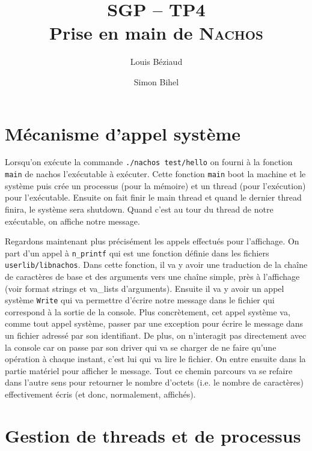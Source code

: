 \documentclass[a4paper,11pt,french]{article}
\title{SGP -- TP4\\Prise en main de \textsc{Nachos}}
\author{Louis Béziaud \and Simon Bihel}
\begin{document}
\maketitle

\section{Mécanisme d'appel système}
Lorsqu'on exécute la commande \texttt{./nachos test/hello} on fourni à la fonction \texttt{main} de nachos l'exécutable à exécuter. Cette fonction \texttt{main} boot la machine et le système puis crée un processus (pour la mémoire) et un thread (pour l'exécution) pour l'exécutable. Ensuite on fait finir le main thread et quand le dernier thread finira, le système sera shutdown. Quand c'est au tour du thread de notre exécutable, on affiche notre message.


Regardons maintenant plus précisément les appels effectués pour l'affichage. On part d'un appel à \texttt{n\_printf} qui est une fonction définie dans les fichiers \texttt{userlib/libnachos}. Dans cette fonction, il va y avoir une traduction de la chaîne de caractères de base et des arguments vers une chaîne simple, près à l'affichage (voir format strings et va\_lists d'arguments). Ensuite il va y avoir un appel système \texttt{Write} qui va permettre d'écrire notre message dans le fichier qui correspond à la sortie de la console. Plus concrètement, cet appel système va, comme tout appel système, passer par une exception pour écrire le message dans un fichier adressé par son identifiant. De plus, on n'interagit pas directement avec la console car on passe par son driver qui va se charger de ne faire qu'une opération à chaque instant, c'est lui qui va lire le fichier. On entre ensuite dans la partie matériel pour afficher le message. Tout ce chemin parcours va se refaire dans l'autre sens pour retourner le nombre d'octets (i.e. le nombre de caractères) effectivement écris (et donc, normalement, affichés).

\section{Gestion de threads et de processus}
\end{document}
